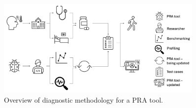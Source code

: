 \begin{figure}[h!]
    \centering
    \includegraphics[width=0.9\textwidth]{3_identifying_gaps/benchmarking/profiling_methods/figures/diagnostic.png}
    \caption{Overview of diagnostic methodology for a PRA tool.}
    \label{fig:diagnostic}
\end{figure}